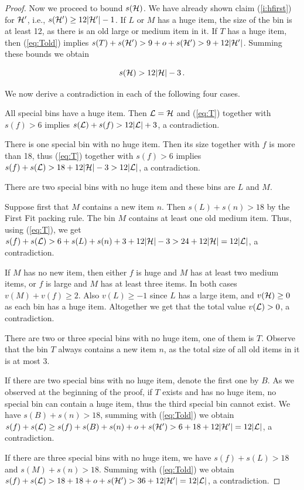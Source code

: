 \begin{proof}
Now we proceed to bound $s({\mathcal H})$. We have already shown claim
(\ref{i:hfirst}) for ${\mathcal H}'$, i.e., $s({\mathcal H}')\geq12|{\mathcal H}'|-1$. If $L$ or
$M$ has a huge item, the size of the bin is at least 12, as there is
an old large or medium item in it. If $T$ has a huge item, then
(\ref{eq:Told}) implies $s(T)+s({\mathcal H}')>9+
o+s({\mathcal H}')>9+12|{\mathcal H}'|$. Summing these bounds we obtain

\begin{equation}
s({\mathcal H}) > 12|{\mathcal H}|-3 \,. \label{eq:T}
\end{equation}
 
We now derive a contradiction in each of the following four cases.

 All special bins have a huge item.  Then
${\mathcal L}={\mathcal H}$ and (\ref{eq:T}) together with $s(f)>6$ implies
$s({\mathcal L})+s(f)>12|{\mathcal L}|+3$, a contradiction.

 There is one special bin with no huge item.  Then its
size together with $f$ is more than 18, thus (\ref{eq:T}) together
with $s(f)>6$ implies $s(f)+s({\mathcal L})>18+12|{\mathcal H}|-3>12|{\mathcal L}|$, a
contradiction.

 There are two special bins with no huge item and these
bins are $L$ and $M$.

Suppose first that $M$ contains a new item $n$. Then $s(L)+s(n)>18$ by
the First Fit packing rule. The bin $M$ contains at least one old
medium item.  Thus, using (\ref{eq:T}), we get
$s(f)+s({\mathcal L})>6+s(L)+s(n)+3+12|{\mathcal H}|-3> 24+ 12|{\mathcal H}|=12|{\mathcal L}|$, a
contradiction.

If $M$ has no new item, then either $f$ is huge and $M$ has at least
two medium items, or $f$ is large and $M$ has at least three items. In
both cases $v(M)+v(f)\geq 2$. Also $v(L)\geq -1$ since $L$ has a large
item, and $v({\mathcal H})\geq0$ as each bin has a huge item. Altogether we
get that the total value $v({\mathcal L})>0$, a contradiction.

 There are two or three special bins with no huge
item, one of them is $T$. Observe that the bin $T$ always contains a
new item $n$, as the total size of all old items in it is at most $3$. 

If there are two special bins with no huge item, denote the first one by
$B$. As we observed at the beginning of the proof, if $T$ exists and
has no huge item, no special bin can contain a huge item, thus the
third special bin cannot exist. We have
$s(B)+s(n)>18$, summing with (\ref{eq:Told}) we obtain
$s(f)+s({\mathcal L})\geq
s(f)+s(B)+s(n)+o+s({\mathcal H}')>6+18+12|{\mathcal H}'|=12|{\mathcal L}|$, a contradiction.

If there are three special bins with no huge item, we have
$s(f)+s(L)>18$ and $s(M)+s(n)>18$. Summing with (\ref{eq:Told}) we
obtain $s(f)+s({\mathcal L})>18+18+o+s({\mathcal H}')>36+12|{\mathcal H}'|=12|{\mathcal L}|$, a
contradiction.
\end{proof}


